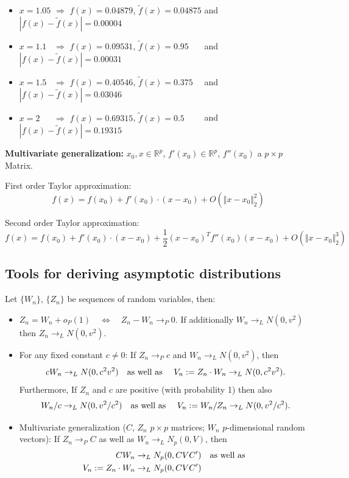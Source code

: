 \documentclass[]{book}
\providecommand{\tightlist}{%
  \setlength{\itemsep}{0pt}\setlength{\parskip}{0pt}}
\theoremstyle{definition}
\theoremstyle{definition}
\theoremstyle{definition}
\theoremstyle{remark}
\begin{document}
\begin{itemize}
\tightlist
\item
  \(x=1.05\) \(\Rightarrow\) \(f(x)=0.04879\), \(\tilde f(x)=0.04875\) and \(|f(x)-\tilde f(x)|=0.00004\)
\item
  \(x=1.1\phantom{0}\) \(\Rightarrow\) \(f(x)=0.09531\), \(\tilde f(x)=0.95\phantom{000}\) and \(|f(x)-\tilde f(x)|=0.00031\)
\item
  \(x=1.5\phantom{0}\) \(\Rightarrow\) \(f(x)=0.40546\), \(\tilde f(x)=0.375\phantom{00}\) and \(|f(x)-\tilde f(x)|=0.03046\)
\item
  \(x=2\phantom{.00}\) \(\Rightarrow\) \(f(x)=0.69315\), \(\tilde f(x)=0.5\phantom{0000}\) and \(|f(x)-\tilde f(x)|=0.19315\)
\end{itemize}

\textbf{Multivariate generalization:} \(x_0,x\in\mathbb{R}^p\), \(f'(x_0)\in\mathbb{R}^p\), \(f''(x_0)\) a \(p\times p\) Matrix.

First order Taylor approximation:
\[f(x)=f(x_0)+f'(x_0)\cdot(x-x_0)+O(\Vert x-x_0\Vert_2^2)\]

Second order Taylor approximation:
\[f(x)=f(x_0)+f'(x_0)\cdot(x-x_0)+\frac{1}{2} (x-x_0)^T f''(x_0)(x-x_0)+O(\Vert x-x_0\Vert_2^3)\]

\hypertarget{tools-for-deriving-asymptotic-distributions}{%
\subsection{Tools for deriving asymptotic distributions}\label{tools-for-deriving-asymptotic-distributions}}

Let \(\{W_n\}\), \(\{Z_n\}\) be sequences of random variables, then:

\begin{itemize}
\tightlist
\item
  \(Z_n=W_n+o_P(1)\quad \Leftrightarrow \quad Z_n-W_n\to_P 0\). If additionally \(W_n\to_L N(0,v^2)\) then \(Z_n\to_L N(0,v^2)\).
\item
  For any fixed constant \(c\neq 0\): If \(Z_n\to_P c\) and \(W_n\to_L N(0,v^2)\), then
  \[cW_n\to_L N(0,c^2v^2)\quad\hbox{as well as }\quad  V_n:=Z_n\cdot W_n\to_L N(0,c^2v^2).\]
  Furthermore, If \(Z_n\) and \(c\) are positive (with probability 1) then also
  \[W_n/c\to_L N(0,v^2/c^2)\quad\hbox{as well as }\quad  V_n:= W_n/Z_n\to_L N(0,v^2/c^2).\]
\item
  Multivariate generalization (\(C\), \(Z_n\) \(p\times p\) matrices; \(W_n\) \(p\)-dimensional random vectors):
  If \(Z_n\to_P C\) as well as \(W_n\to_L N_p(0,V)\), then
  \begin{align*}
  CW_n&\to_L N_p(0,CVC')\quad\hbox{as well as }\\
  V_n:=Z_n\cdot W_n&\to_L N_p(0,CVC')
  \end{align*}
\end{itemize}
\end{document}
